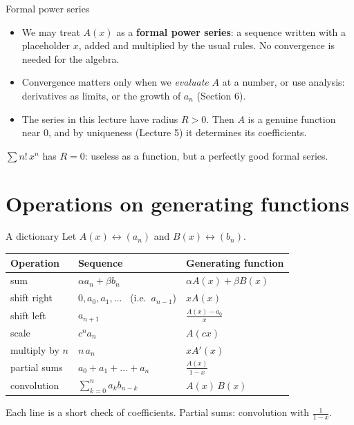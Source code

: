 \documentclass[10pt]{wosm-slides}
\begin{document}
\begin{frame}{Formal power series}
  \begin{itemize}
    \item We may treat $A(x)$ as a \textbf{formal power series}: a sequence written with a
      placeholder $x$, added and multiplied by the usual rules. No convergence is needed for the
      algebra.
    \item Convergence matters only when we \emph{evaluate} $A$ at a number, or use analysis:
      derivatives as limits, or the growth of $a_n$ (Section 6).
    \item The series in this lecture have radius $R > 0$. Then $A$ is a genuine function near
      $0$, and by uniqueness (Lecture 5) it determines its coefficients.
  \end{itemize}
  \pause
  \begin{example}
    $\sum n!\, x^n$ has $R = 0$: useless as a function, but a perfectly good formal series.
  \end{example}
\end{frame}

\section{Operations on generating functions}

\begin{frame}{A dictionary}
  Let $A(x) \leftrightarrow (a_n)$ and $B(x) \leftrightarrow (b_n)$.
  \begin{center}
  \small\renewcommand{\arraystretch}{1.22}
  \begin{tabular}{@{}lll@{}}
    \toprule
    \textbf{Operation} & \textbf{Sequence} & \textbf{Generating function} \\
    \midrule
    sum            & $\alpha a_n + \beta b_n$ & $\alpha A(x) + \beta B(x)$ \\
    shift right    & $0, a_0, a_1, \dots$ \ (i.e.\ $a_{n-1}$) & $x A(x)$ \\
    shift left     & $a_{n+1}$                & $\frac{A(x) - a_0}{x}$ \\
    scale          & $c^n a_n$                & $A(cx)$ \\
    multiply by $n$ & $n\, a_n$               & $x A'(x)$ \\
    partial sums   & $a_0 + a_1 + \dots + a_n$ & $\frac{A(x)}{1 - x}$ \\
    convolution    & $\sum_{k=0}^n a_k b_{n-k}$ & $A(x)\, B(x)$ \\
    \bottomrule
  \end{tabular}
  \end{center}
  {\small Each line is a short check of coefficients. Partial sums: convolution with $\frac{1}{1-x}$.\par}
\end{frame}
\end{document}
